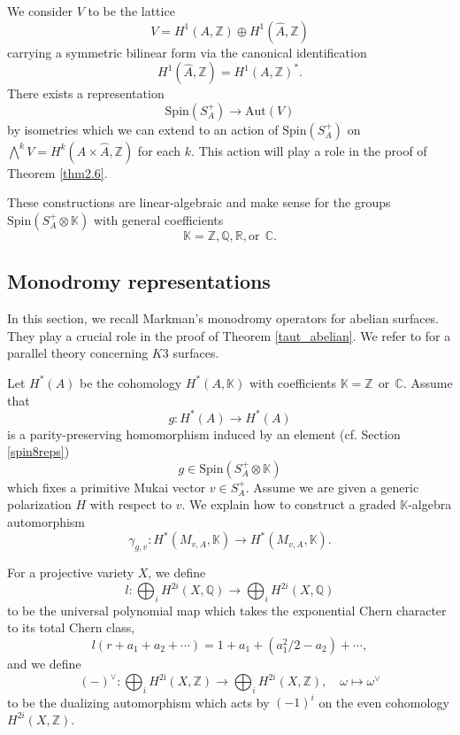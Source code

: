 \documentclass[11pt]{amsart}
\theoremstyle{plain}
\theoremstyle{definition}
\theoremstyle{remark}
\newcommand{\BC}{{\mathbb{C}}}
\newcommand{\BK}{{\mathbb{K}}}
\newcommand{\BQ}{{\mathbb{Q}}}
\newcommand{\BR}{{\mathbb{R}}}
\newcommand{\BZ}{{\mathbb{Z}}}
\begin{document}
We consider $V$ to be the lattice 
\[
V = H^1(A, \BZ) \oplus H^1(\hat{A} ,\BZ)
\]
carrying a symmetric bilinear form via the canonical identification \[
H^1(\hat{A}, \BZ) = H^1(A, \BZ)^*.
\]
There exists a representation 
\[\mathrm{Spin}(S_A^+) \rightarrow \mathrm{Aut}(V)\]
by isometries which we can extend to an action of $\mathrm{Spin}(S_A^+)$
on $\bigwedge^{k}V = H^{k}(A \times \hat{A},\BZ)$ for each $k$. This action will play a role in the proof
of Theorem \ref{thm2.6}.

These constructions are linear-algebraic and make sense for the groups $\mathrm{Spin}(S_A^+\otimes \BK)$ with general coefficients 
\[
\BK = \BZ, \BQ, \BR, \mathrm{or}~~ \BC.
\]
 
 



\subsection{Monodromy representations}\label{Monodromy} 
In this section, we recall Markman's monodromy operators \cite{Markman3} for abelian surfaces. They play a crucial role in the proof of Theorem \ref{taut_abelian}. We refer to \cite{Markman2} for a parallel theory concerning $K3$ surfaces. 

Let $H^\ast(A)$ be the cohomology $H^\ast(A, \BK)$ with coefficients $\BK = \BZ~~\mathrm{or}~~ \BC$.  Assume that
\[
g: H^*(A) \to H^*(A)
\]
is a parity-preserving homomorphism induced by an element (cf. Section \ref{spin8reps})
\[
g \in \mathrm{Spin}(S_A^+\otimes \BK)
\]
 which fixes a primitive Mukai vector $v\in S_A^+$. 
Assume we are given a generic polarization $H$ with respect to $v$.
We explain how to construct a graded $\BK$-algebra automorphism
\begin{equation*}\label{mono1}
\gamma_{g,v}:  H^*(M_{v,A}, \BK) \to H^*(M_{v,A}, \BK).
\end{equation*}



For a projective variety $X$, we define
\[
l: \bigoplus_i H^{2i}(X, \BQ) \rightarrow \bigoplus_i H^{2i}(X, \BQ) 
\]
to be the universal polynomial map which takes the exponential Chern character to its total Chern class,
\[
l(r+a_1+a_2 + \cdots) = 1+a_1 + (a_1^2/2-a_2) + \cdots,
\]
and we define
\[
(-)^\vee: \bigoplus_iH^\mathrm{2i}(X, \BZ) \to \bigoplus_i H^{2i}(X, \BZ), \quad \omega \mapsto \omega^\vee
\]
to be the dualizing automorphism which acts by $(-1)^i$  on the even cohomology $H^{2i}(X, \BZ)$. 
\end{document}
